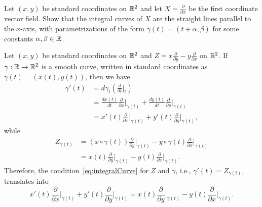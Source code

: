 \begin{exercise}
	Let $(x,y)$ be standard coordinates on $\mathbb{R}^2$ and let $X=\frac{\partial}{\partial x}$ be the first coordinate vector field.
	Show that the integral curves of $X$ are the straight lines parallel to the $x$-axis, with parametrizations of the form $\gamma(t) = (t + \alpha, \beta)$ for some constants $\alpha, \beta \in \mathbb{R}$.
\end{exercise}

\begin{example}\label{ex:rotation}
	Let $(x,y)$ be standard coordinates on $\mathbb{R}^2$ and $Z = x\frac{\partial}{\partial y} - y\frac{\partial}{\partial x}$ on $\mathbb{R}^2$.
	If $\gamma:\mathbb{R}\to\mathbb{R}^2$ is a smooth curve, written in standard coordinates as $\gamma(t) = (x(t), y(t))$, then we have
	\begin{align}
		\gamma'(t)
		 & = d\gamma_t\left(\frac{d}{dt}\Big|_t\right)                                                                                         \\
		 & = \frac{d x(t)}{d t} \frac{\partial}{\partial x}\Big|_{\gamma(t)} + \frac{d y(t)}{d t} \frac{\partial}{\partial y}\Big|_{\gamma(t)} \\
		 & = x'(t)\frac{\partial}{\partial x}\Big|_{\gamma(t)} + y'(t)\frac{\partial}{\partial y}\Big|_{\gamma(t)},
	\end{align}
	while
	\begin{align}
		Z_{\gamma(t)}
		 & = (x\circ \gamma(t))\frac{\partial}{\partial y}\Big|_{\gamma(t)} - y \circ \gamma(t)\frac{\partial}{\partial x}\Big|_{\gamma(t)} \\
		 & = x(t)\frac{\partial}{\partial y}\Big|_{\gamma(t)} - y(t)\frac{\partial}{\partial x}\Big|_{\gamma(t)}.
	\end{align}
	Therefore, the condition~\eqref{eq:integralCurve} for $Z$ and $\gamma$, i.e., $\gamma'(t) = Z_{\gamma(t)}$, translates into
	\begin{equation}
		x'(t)\frac{\partial}{\partial x}\Big|_{\gamma(t)} + y'(t)\frac{\partial}{\partial y}\Big|_{\gamma(t)} = x(t)\frac{\partial}{\partial y}\Big|_{\gamma(t)} - y(t)\frac{\partial}{\partial x}\Big|_{\gamma(t)}.

\end{equation}
\end{example}
